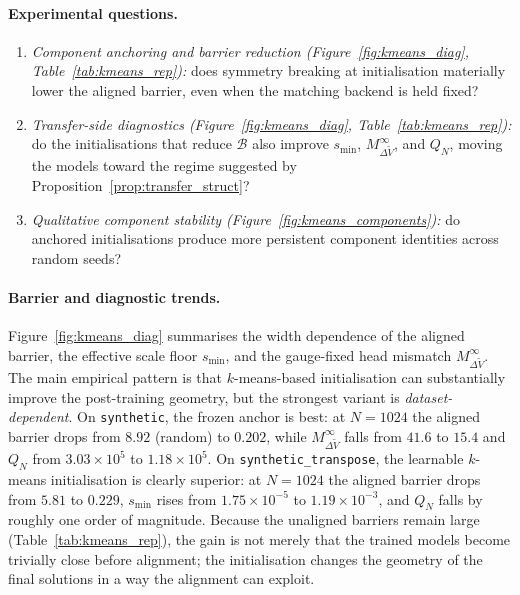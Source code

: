 \documentclass[11pt]{article}
\newcommand{\cB}{\mathcal{B}}
\begin{document}
\paragraph{Experimental questions.}
\begin{enumerate}[label=(\arabic*),leftmargin=*,itemsep=2pt]
  \item \emph{Component anchoring and barrier reduction
    (Figure~\ref{fig:kmeans_diag}, Table~\ref{tab:kmeans_rep}):}
    does symmetry breaking at initialisation materially lower the
    aligned barrier, even when the matching backend is held fixed?
  \item \emph{Transfer-side diagnostics
    (Figure~\ref{fig:kmeans_diag}, Table~\ref{tab:kmeans_rep}):}
    do the initialisations that reduce $\cB$ also improve
    $s_{\min}$, $M_{\Delta \tilde V}^\infty$, and $Q_N$,
    moving the models toward the regime suggested by
    Proposition~\ref{prop:transfer_struct}?
  \item \emph{Qualitative component stability
    (Figure~\ref{fig:kmeans_components}):}
    do anchored initialisations produce more persistent component
    identities across random seeds?
\end{enumerate}

\paragraph{Barrier and diagnostic trends.}
Figure~\ref{fig:kmeans_diag} summarises the width dependence of the
aligned barrier, the effective scale floor $s_{\min}$, and the
gauge-fixed head mismatch $M_{\Delta \tilde V}^\infty$.
The main empirical pattern is that $k$-means-based initialisation can
substantially improve the post-training geometry, but the strongest
variant is \emph{dataset-dependent}.
On \texttt{synthetic}, the frozen anchor is best: at $N=1024$ the
aligned barrier drops from $8.92$ (random) to $0.202$, while
$M_{\Delta \tilde V}^\infty$ falls from $41.6$ to $15.4$ and
$Q_N$ from $3.03 \times 10^5$ to $1.18 \times 10^5$.
On \texttt{synthetic\_transpose}, the learnable $k$-means
initialisation is clearly superior: at $N=1024$ the aligned barrier
drops from $5.81$ to $0.229$, $s_{\min}$ rises from
$1.75 \times 10^{-5}$ to $1.19 \times 10^{-3}$, and
$Q_N$ falls by roughly one order of magnitude.
Because the unaligned barriers remain large
(Table~\ref{tab:kmeans_rep}),
the gain is not merely that the trained models become trivially close
before alignment; the initialisation changes the geometry of the final
solutions in a way the alignment can exploit.
\end{document}
